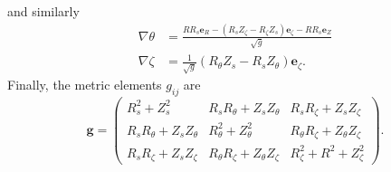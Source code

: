 and similarly
\begin{align}
	\nabla\theta &= \frac{RR_s\mathbf{e}_R - (R_s Z_\zeta-R_\zeta Z_s)\mathbf{e}_\zeta - RR_s\mathbf{e}_Z}{\sqrt{g}}\\
	\nabla\zeta &= \frac{1}{\sqrt{g}}(R_\theta Z_s-R_s Z_\theta)\mathbf{e}_\zeta.
\end{align}
Finally, the metric elements $g_{ij}$ are
\begin{equation}
	\mathbf{g}=\begin{pmatrix}
		R_s^2 + Z_s^2 & R_s R_\theta + Z_s Z_\theta &  R_s R_\zeta + Z_s Z_\zeta\\
		R_s R_\theta + Z_s Z_\theta & R_\theta^2 + Z_\theta^2 &  R_\theta R_\zeta + Z_\theta Z_\zeta\\
		R_s R_\zeta + Z_s Z_\zeta & R_\theta R_\zeta + Z_\theta Z_\zeta & R_\zeta^2 + R^2 + Z_\zeta^2
	\end{pmatrix}.
\end{equation}



